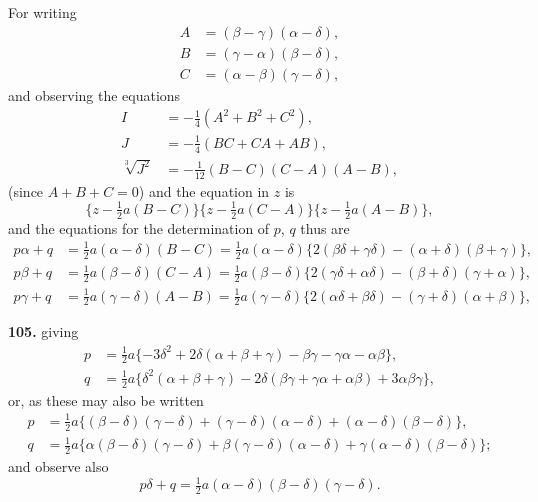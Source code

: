 \documentclass[11pt,a4paper]{article}
\theoremstyle{plain}
\begin{document}
For writing
\begin{align*}
A &= (\beta - \gamma)(\alpha - \delta), \\
B &= (\gamma - \alpha)(\beta - \delta), \\
C &= (\alpha - \beta)(\gamma - \delta),
\end{align*}
and observing the equations
\begin{align*}
I &= -\tfrac{1}{4}(A^2 + B^2 + C^2), \\
J &= -\tfrac{1}{4}(BC + CA + AB), \\
\sqrt[3]{J^2} &= -\tfrac{1}{12}(B - C)(C - A)(A - B),
\end{align*}
(since $A + B + C = 0$) and the equation in $z$ is
\[
\{z - \tfrac{1}{2}a(B - C)\}\{z - \tfrac{1}{2}a(C - A)\}\{z - \tfrac{1}{2}a(A - B)\},
\]
and the equations for the determination of $p$, $q$ thus are
\begin{align*}
p\alpha + q &= \tfrac{1}{2}a(\alpha - \delta)(B - C) = \tfrac{1}{2}a(\alpha - \delta)\{2(\beta\delta + \gamma\delta) - (\alpha + \delta)(\beta + \gamma)\}, \\
p\beta + q &= \tfrac{1}{2}a(\beta - \delta)(C - A) = \tfrac{1}{2}a(\beta - \delta)\{2(\gamma\delta + \alpha\delta) - (\beta + \delta)(\gamma + \alpha)\}, \\
p\gamma + q &= \tfrac{1}{2}a(\gamma - \delta)(A - B) = \tfrac{1}{2}a(\gamma - \delta)\{2(\alpha\delta + \beta\delta) - (\gamma + \delta)(\alpha + \beta)\},
\end{align*}

\noindent\textbf{105.} giving
\begin{align*}
p &= \tfrac{1}{2}a\{-3\delta^2 + 2\delta(\alpha + \beta + \gamma) - \beta\gamma - \gamma\alpha - \alpha\beta\}, \\
q &= \tfrac{1}{2}a\{\delta^2(\alpha + \beta + \gamma) - 2\delta(\beta\gamma + \gamma\alpha + \alpha\beta) + 3\alpha\beta\gamma\},
\end{align*}
or, as these may also be written
\begin{align*}
p &= \tfrac{1}{2}a\{(\beta - \delta)(\gamma - \delta) + (\gamma - \delta)(\alpha - \delta) + (\alpha - \delta)(\beta - \delta)\}, \\
q &= \tfrac{1}{2}a\{\alpha(\beta - \delta)(\gamma - \delta) + \beta(\gamma - \delta)(\alpha - \delta) + \gamma(\alpha - \delta)(\beta - \delta)\};
\end{align*}
and observe also
\[
p\delta + q = \tfrac{1}{2}a(\alpha - \delta)(\beta - \delta)(\gamma - \delta).
\]
\end{document}
